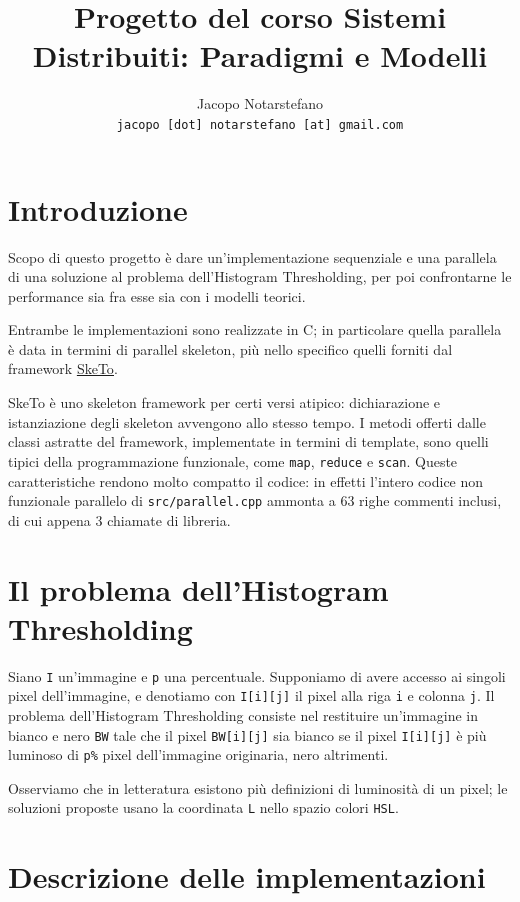 \documentclass[10pt]{article}
\title{Progetto del corso Sistemi Distribuiti: Paradigmi e Modelli}
\author{
	Jacopo Notarstefano\\
	\texttt{jacopo [dot] notarstefano [at] gmail.com}
}
\date{}
\newcommand{\cpp}{C\nolinebreak\hspace{-.05em}\raisebox{.4ex}{\tiny\bf +}\nolinebreak\hspace{-.10em}\raisebox{.4ex}{\tiny\bf +}}
\begin{document}
  \maketitle
    \section{Introduzione}

    Scopo di questo progetto è dare un'implementazione sequenziale e una
    parallela di una soluzione al problema dell'Histogram Thresholding, per
    poi confrontarne le performance sia fra esse sia con i modelli teorici.

    Entrambe le implementazioni sono realizzate in \cpp; in particolare
    quella parallela è data in termini di parallel skeleton, più nello
    specifico quelli forniti dal framework 
    \href{http://sketo.ipl-lab.org/}{\underline{SkeTo}}.

    SkeTo è uno skeleton framework per certi versi atipico: dichiarazione e
    istanziazione degli skeleton avvengono allo stesso tempo. I metodi
    offerti dalle classi astratte del framework, implementate in termini di
    template, sono quelli tipici della programmazione funzionale, come
    \texttt{map}, \texttt{reduce} e \texttt{scan}. Queste caratteristiche
    rendono molto compatto il codice: in effetti l'intero codice non
    funzionale parallelo di \texttt{src/parallel.cpp} ammonta a \(63\) righe 
    commenti inclusi, di cui appena \(3\) chiamate di libreria.

    \section{Il problema dell'Histogram Thresholding}

    Siano \texttt{I} un'immagine e \texttt{p} una percentuale. Supponiamo di 
    avere accesso ai singoli pixel dell'immagine, e denotiamo con 
    \texttt{I[i][j]} il pixel alla riga \texttt{i} e colonna \texttt{j}.
    Il problema dell'Histogram Thresholding consiste nel restituire
    un'immagine in bianco e nero \texttt{BW} tale che il pixel
    \texttt{BW[i][j]} sia bianco se il pixel \texttt{I[i][j]} è più luminoso
    di \texttt{p\%} pixel dell'immagine originaria, nero altrimenti.

    Osserviamo che in letteratura esistono più definizioni di luminosità di 
    un pixel; le soluzioni proposte usano la coordinata \texttt{L} nello 
    spazio colori \texttt{HSL}.

    \section{Descrizione delle implementazioni}
\end{document}
